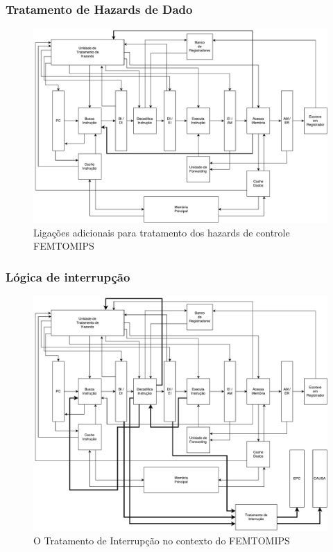 \documentclass[11pt,a4paper]{article}
\begin{document}
\subsubsection{Tratamento de Hazards de Dado}

	\begin{figure}[!ht]
  	\centering	
    \includegraphics[scale=0.50, angle=270]{FEMTOMIPS_GLOBAL_BRANCH}
    \caption{Ligações adicionais para tratamento dos hazards de controle FEMTOMIPS}
	\end{figure}

\subsubsection{Lógica de interrupção}

	\begin{figure}[!ht]
  	\centering	
    \includegraphics[scale=0.50, angle=270]{FEMTOMIPS_GLOBAL_INTERRUPT}
    \caption{O Tratamento de Interrupção no contexto do FEMTOMIPS}
	\end{figure}
	
\end{document}
